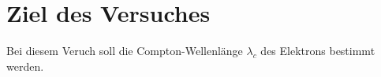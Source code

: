 \section{Ziel des Versuches}
\label{sec:Ziel des Versuches}
Bei diesem Veruch soll die Compton-Wellenlänge $\lambda_c$ des Elektrons bestimmt werden.